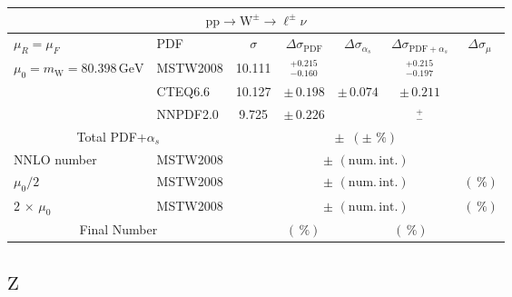 \begin{table}[htb]
  \begin{center}
    \begin{tabular}{|l|l|c|c|c|c|c|}
      \hline
      
      \multicolumn{7}{|c|}{$\mathrm{pp}\to\mathrm{W}^\pm\to{\ell^\pm\nu}$}\\ \hline
      $\mu_R=\mu_F$ & PDF & $\sigma$ & $\Delta\sigma_{\mathrm{PDF}}$ & $\Delta\sigma_{\alpha_s}$ & $\Delta\sigma_{\mathrm{PDF}+\alpha_s}$ & $\Delta\sigma_{\mu}$ \\ \hline\hline

      $\mu_0=m_\mathrm{W}=80.398\,\mathrm{GeV}$ & MSTW2008 & 10.111 & $^{+0.215}_{-0.160}$ &     &  $^{+0.215}_{-0.197}$    &     \\
                                                & CTEQ6.6  & 10.127 & $\pm\,0.198$ &  $\pm\,0.074$  &  $\pm\,0.211$       &     \\
                                                & NNPDF2.0 & 9.725 & $\pm\,0.226$ &  $^{}_{}$  & $^{+}_{-}$     &     \\ \hline\hline
      \multicolumn{2}{|c|}{Total PDF+$\alpha_s$}      &    & \multicolumn{3}{c|}{$\pm\,\,\,(\pm\,\,\%)$} & \\ \hline\hline
      NNLO number                               & MSTW2008 &  & \multicolumn{3}{c|}{$\pm\,\,(\mathrm{num.\,int.})$} & \\
      $\mu_0/2$                                 & MSTW2008 &  & \multicolumn{3}{c|}{$\pm\,\,(\mathrm{num.\,int.})$} & $\,(\,\%)$\\ 
      $2\,\times\,\mu_0$                        & MSTW2008 &  & \multicolumn{3}{c|}{$\pm\,\,(\mathrm{num.\,int.})$} & $\,(\,\%)$\\ \hline\hline
      \multicolumn{2}{|c|}{Final Number} &  & \multicolumn{2}{l}{$\,(\,\%)$} & \multicolumn{2}{l|}{$\,(\,\%)$} \\


\hline 
\end{tabular}
\end{center}
\end{table} 



\subsection*{\boldmath $\mathrm{Z}$}

